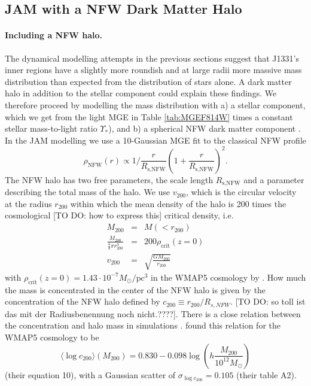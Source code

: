 \subsection{JAM with a NFW Dark Matter Halo} \label{sec:results_JAM_NFW}

\paragraph{Including a NFW halo.} The dynamical modelling attempts in the previous sections suggest that J1331's inner regions have a slightly more roundish and at large radii more massive mass distribution than expected from the distribution of stars alone. A dark matter halo in addition to the stellar component could explain these findings. We therefore proceed by modelling the mass distribution with a) a stellar component, which we get from the light MGE in Table \ref{tab:MGEF814W} times a constant stellar mass-to-light ratio $\Upsilon_*$), and b) a spherical NFW dark matter component \citep{Navarro+1995c,NFW96}. In the JAM modelling we use a 10-Gaussian MGE fit to the classical NFW profile
\begin{equation*}
\rho_\text{NFW}(r) \propto 1 / \frac{r}{R_\text{s,NFW}} \left( 1 + \frac{r}{R_\text{s,NFW}} \right)^2.
\end{equation*}
The NFW halo has two free parameters, the scale length $R_\text{s,NFW}$ and a parameter describing the total mass of the halo. We use $v_\text{200}$, which is the circular velocity at the radius $r_\text{200}$ within which the mean density of the halo is 200 times the cosmological [TO DO: how to express this] critical density, i.e.
\begin{eqnarray*}
M_\text{200} &=& M(<r_{200})\\
\frac{M_{200}}{ \frac 43 \pi r_{200}^3} &=& 200 \rho_\text{crit}(z=0) \\
v_\text{200} &=& \sqrt{\frac{GM_{200}}{r_\text{200}}}
\end{eqnarray*}
with $\rho_\text{crit}(z=0)=1.43 \cdot 10^{-7} M_\odot / \text{pc}^3$ in the WMAP5 cosmology by \citet{WMAP5cosm}. How much the mass is concentrated in the center of the NFW halo is given by the concentration of the NFW halo defined by $c_{200}\equiv r_{200} / R_{s,NFW}$. [TO DO: so toll ist das mit der Radiusbenennung noch nicht.????]. There is a close relation between the concentration and halo mass in simulations \citep{NFW96}. \citet{Maccio08} found this relation for the WMAP5 cosmology \citep{WMAP5cosm} to be
\begin{equation}
\langle \log c_{200} \rangle (M_{200}) = 0.830 - 0.098 \log \left(h \frac{M_{200}}{10^{12} M_\odot} \right) \label{eq:Maccio08}
\end{equation}
(their equation 10), with a Gaussian scatter of $\sigma_{\log c_{200}} = 0.105$ (their table A2).


